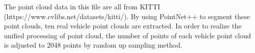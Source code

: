 The point cloud data in this file are all from KITTI (https://www.cvlibs.net/datasets/kitti/). By using PointNet++ to segment these point clouds, ten real vehicle point clouds are extracted. In order to realize the unified processing of point cloud, the number of points of each vehicle point cloud is adjusted to 2048 points by random up sampling method.
